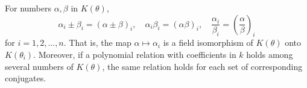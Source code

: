 For numbers $\alpha, \beta$ in $K(\theta)$,
$$\alpha_i \pm \beta_i = (\alpha \pm \beta)_i, \quad
\alpha_i \beta_i = (\alpha\beta)_i, \quad
\frac{\alpha_i}{\beta_i} = \left(\frac{\alpha}{\beta}\right)_i$$
for $i = 1, 2, \ldots, n$. That is, the map $\alpha \mapsto \alpha_i$ is a field isomorphism of $K(\theta)$ onto $K(\theta_i)$. Moreover, if a polynomial relation with coefficients in $k$ holds among several numbers of $K(\theta)$, the same relation holds for each set of corresponding conjugates.
